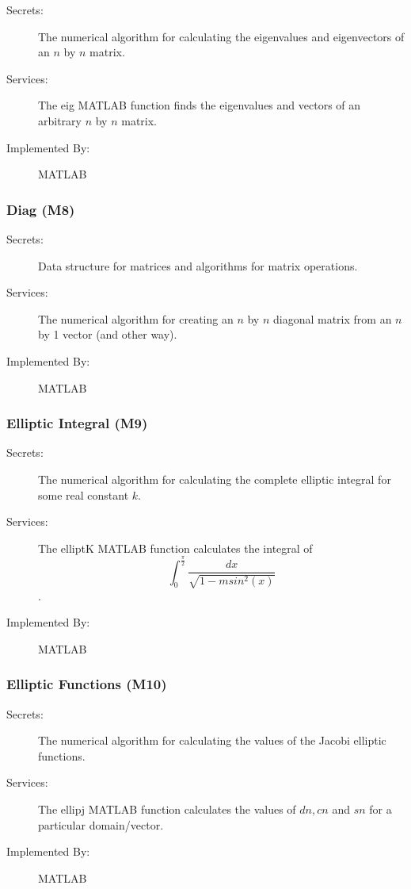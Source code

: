 \documentclass[12pt, titlepage]{article}
\begin{document}
	\begin{description}
		\item[Secrets:] The numerical algorithm for calculating the eigenvalues 
		and 
		eigenvectors of an 
		$n$ by $n$ matrix.
		\item[Services:] The eig MATLAB function finds the eigenvalues and 
		vectors 
		of an 
		arbitrary $n$ by $n$ matrix.
		\item[Implemented By:] MATLAB
	\end{description} 
	
	\subsubsection{ Diag (M8)} \label{M8}
	
	\begin{description}
		\item[Secrets:] Data structure for matrices and algorithms for matrix 
		operations.
		\item[Services:] The numerical algorithm for creating an $n$ by $n$ 
		diagonal 
		matrix from an $n$ by 1 vector (and other way).
		\item[Implemented By:] MATLAB
	\end{description} 
	
	\subsubsection{Elliptic Integral (M9)} \label{M9}
	
	\begin{description}
		\item[Secrets:] The numerical algorithm for calculating the complete 
		elliptic integral for some real constant $k$. 
		\item[Services:] The elliptK MATLAB function calculates the integral of 
		$$ 
		\int_{0}^{\frac{\pi}{2}} \frac{dx}{\sqrt{1-msin^{2}(x)}}$$. \\ 
		\item[Implemented By:] MATLAB
	\end{description} 
	
	\subsubsection{Elliptic Functions (M10)} \label{M10}
	
	\begin{description}
		\item[Secrets:] The numerical algorithm for calculating the values of 
		the 
		Jacobi elliptic functions. 
		\item[Services:] The ellipj MATLAB function calculates the values of 
		$dn,cn$ 
		and $sn$ for a particular domain/vector. 
		\item[Implemented By:] MATLAB
	\end{description} 
	
\end{document}
